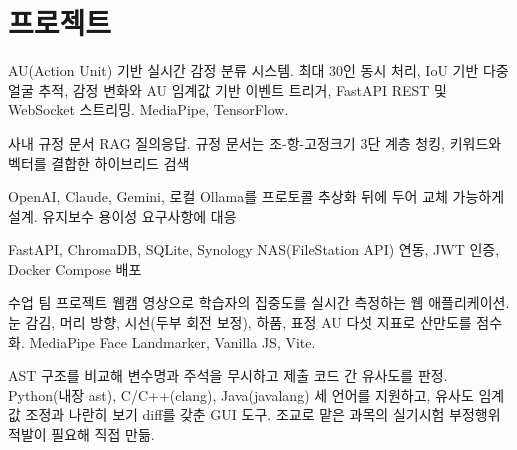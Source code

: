 \documentclass[korean,small]{cv}
\begin{document}
\section{프로젝트}
  {}
  {AU(Action Unit) 기반 실시간 감정 분류 시스템. 최대 30인 동시 처리,
   IoU 기반 다중 얼굴 추적, 감정 변화와 AU 임계값 기반 이벤트 트리거,
   FastAPI REST 및 WebSocket 스트리밍. MediaPipe, TensorFlow.}

  {}
  {\begin{cvitems}
     \item 사내 규정 문서 RAG 질의응답. 규정 문서는 조-항-고정크기 3단 계층 청킹,
           키워드와 벡터를 결합한 하이브리드 검색
     \item OpenAI, Claude, Gemini, 로컬 Ollama를 프로토콜 추상화 뒤에 두어 교체 가능하게 설계.
           유지보수 용이성 요구사항에 대응
     \item FastAPI, ChromaDB, SQLite, Synology NAS(FileStation API) 연동,
           JWT 인증, Docker Compose 배포
   \end{cvitems}}

  {수업 팀 프로젝트}
  {}
  {웹캠 영상으로 학습자의 집중도를 실시간 측정하는 웹 애플리케이션.
   눈 감김, 머리 방향, 시선(두부 회전 보정), 하품, 표정 AU 다섯 지표로 산만도를 점수화.
   MediaPipe Face Landmarker, Vanilla JS, Vite.}

  {}
  {AST 구조를 비교해 변수명과 주석을 무시하고 제출 코드 간 유사도를 판정.
   Python(내장 ast), C/C++(clang), Java(javalang) 세 언어를 지원하고,
   유사도 임계값 조정과 나란히 보기 diff를 갖춘 GUI 도구.
   조교로 맡은 과목의 실기시험 부정행위 적발이 필요해 직접 만듦.}
\end{document}
